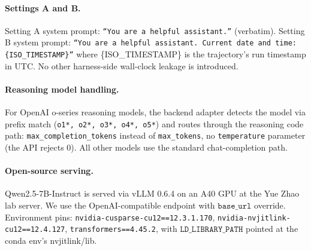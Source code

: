 \paragraph{Settings A and B.}
Setting A system prompt: \texttt{``You are a helpful assistant.''} (verbatim). Setting B system prompt: \texttt{``You are a helpful assistant. Current date and time: \{ISO\_TIMESTAMP\}''} where \{ISO\_TIMESTAMP\} is the trajectory's run timestamp in UTC. No other harness-side wall-clock leakage is introduced.

\paragraph{Reasoning model handling.}
For OpenAI o-series reasoning models, the backend adapter detects the model via prefix match (\texttt{o1*, o2*, o3*, o4*, o5*}) and routes through the reasoning code path: \texttt{max\_completion\_tokens} instead of \texttt{max\_tokens}, no \texttt{temperature} parameter (the API rejects $0$). All other models use the standard chat-completion path.

\paragraph{Open-source serving.}
Qwen2.5-7B-Instruct is served via vLLM 0.6.4 on an A40 GPU at the Yue Zhao lab server. We use the OpenAI-compatible endpoint with $\texttt{base\_url}$ override. Environment pins: \texttt{nvidia-cusparse-cu12==12.3.1.170}, \texttt{nvidia-nvjitlink-cu12==12.4.127}, \texttt{transformers==4.45.2}, with $\texttt{LD\_LIBRARY\_PATH}$ pointed at the conda env's nvjitlink/lib.
